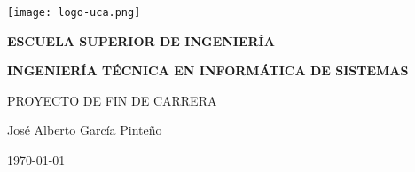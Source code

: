 


\begin{titlepage}

  \begin{center}

    \texttt{[image: logo-uca.png]} \\
    
    \vspace{2.5cm}
    
    \LARGE{\textbf{ESCUELA SUPERIOR DE INGENIERÍA}} \\
    
    \vspace{1.0cm}
    
    \Large{\textbf{INGENIERÍA TÉCNICA EN INFORMÁTICA DE SISTEMAS}} \\
    
    \vspace{3.0cm}
    
    \Large{PROYECTO DE FIN DE CARRERA} \\
    
    \vspace{2.5cm}
    
    \Large{José Alberto García Pinteño} \\
  
    \vspace{0.5cm}

    \large{\today}
    
  \end{center}
\end{titlepage}
